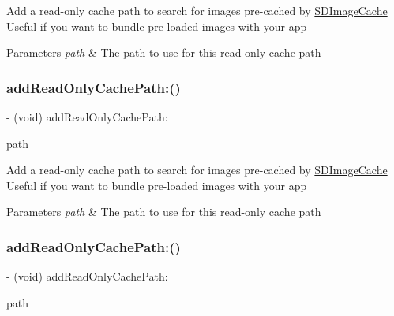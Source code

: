 Add a read-\/only cache path to search for images pre-\/cached by \mbox{\hyperlink{interface_s_d_image_cache}{S\+D\+Image\+Cache}} Useful if you want to bundle pre-\/loaded images with your app


\begin{DoxyParams}{Parameters}
{\em path} & The path to use for this read-\/only cache path \\
\hline
\end{DoxyParams}
\mbox{\label{interface_s_d_image_cache_a9bfedcc9878284b76502287b4b16c1a6}} 
\subsubsection{\texorpdfstring{add\+Read\+Only\+Cache\+Path\+:()}{addReadOnlyCachePath:()}\hspace{0.1cm}{\footnotesize\ttfamily [2/3]}}
{\footnotesize\ttfamily -\/ (void) add\+Read\+Only\+Cache\+Path\+: \begin{DoxyParamCaption}\item[{(N\+S\+String $\ast$)}]{path }\end{DoxyParamCaption}}

Add a read-\/only cache path to search for images pre-\/cached by \mbox{\hyperlink{interface_s_d_image_cache}{S\+D\+Image\+Cache}} Useful if you want to bundle pre-\/loaded images with your app


\begin{DoxyParams}{Parameters}
{\em path} & The path to use for this read-\/only cache path \\
\hline
\end{DoxyParams}
\mbox{\label{interface_s_d_image_cache_a9bfedcc9878284b76502287b4b16c1a6}} 
\subsubsection{\texorpdfstring{add\+Read\+Only\+Cache\+Path\+:()}{addReadOnlyCachePath:()}\hspace{0.1cm}{\footnotesize\ttfamily [3/3]}}
{\footnotesize\ttfamily -\/ (void) add\+Read\+Only\+Cache\+Path\+: \begin{DoxyParamCaption}\item[{(N\+S\+String $\ast$)}]{path }\end{DoxyParamCaption}}

